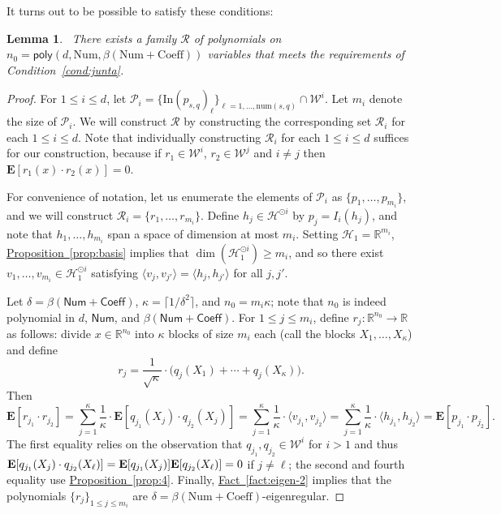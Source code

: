 \documentclass[11pt]{article}
\numberwithin{equation}{section}
\newtheorem{lemma}[theorem]{Lemma}
\theoremstyle{definition}
\theoremstyle{plain}
\newcommand{\R}{\mathbb R}
\newcommand{\expref}[2]{\hyperref[#2]{#1~\ref{#2}}}
\newcommand{\E}{{\bf E}}
\newcommand{\Inner}{\mathrm{In}}
\newcommand{\num}{\mathrm{num}}
\newcommand{\inr}[2]{\langle #1, #2 \rangle}
\newcommand{\Coeff}{\mathsf{Coeff}}
\newcommand{\Num}{\mathsf{Num}}
\begin{document}
It turns out to be possible to satisfy these conditions:
\begin{lemma}~\label{lem:junta-construct}
There exists a family $\mathcal{R}$ of polynomials on
$n_0= \mathsf{poly}(d, \mathrm{Num}, \beta(\mathrm{Num} + \mathrm{Coeff}))$ variables that
meets the requirements of Condition~\ref{cond:junta}.
\end{lemma}

\begin{proof}
For $1 \le i \le d$, let $\mathcal{P}_i = \{\Inner(p_{s,q})_\ell\}_{\ell =
1,\dots, \num({s,q})} \cap  \mathcal{W}^i$. Let $m_i$ denote the size of
$\mathcal{P}_i$. We will construct $\mathcal{R}$ by constructing the
corresponding set $\mathcal{R}_i$ for each $1 \le i \le d$. Note that
individually constructing $\mathcal{R}_i $ for each $1 \le i \le d$ suffices
for our construction, because if $r_1 \in \mathcal{W}^i$, $r_2 \in
\mathcal{W}^j$ and $i \neq j$ then $\mathbf{E}[r_1(x) \cdot r_2(x)]=0$. 

For convenience of notation, let us enumerate the elements of $\mathcal{P}_i$
as $\{p_1, \ldots, p_{m_i}\}$, and we will construct $\mathcal{R}_i = \{r_1,
\ldots, r_{m_i}\}$. Define $h_j \in \mathcal{H}^{\odot i}$ by $p_j = I_i(h_j)$,
and note that $h_1, \dots, h_{m_i}$ span a space of dimension at most $m_i$.
Setting $\mathcal{H}_1 = \R^{m_i}$, \expref{Proposition}{prop:basis} implies
that $\dim(\mathcal{H}_1^{\odot i}) \ge m_i$, and so there exist
$v_1,\dots, v_{m_i} \in \mathcal{H}_1^{\odot i}$ satisfying $\inr{v_j}{v_{j'}}
= \inr{h_j}{h_{j'}}$ for all $j, j'$.

Let $\delta = \beta(\Num + \Coeff)$, $\kappa = \lceil 1/\delta^2 \rceil$, and $n_0 = m_i \kappa$;
note that $n_0$ is indeed polynomial in $d$, $\Num$, and $\beta(\Num + \Coeff)$.
For $1 \le j \le m_i$, define
$r_j: \mathbb{R}^{n_0} \rightarrow \mathbb{R}$ as follows: divide $x \in
\mathbb{R}^{n_0}$ into $\kappa$ blocks of size $m_i$ each (call the blocks $X_1,
\ldots, X_{\kappa}$) and define
\[
r_j = \frac{1}{\sqrt{\kappa}} \cdot \big( q_{j}(X_1) + \cdots  + q_{j}(X_\kappa)\big). 
\]
Then
\[
\mathbf{E}[r_{j_1} \cdot r_{j_2}] = \sum_{j=1}^\kappa \frac{1}{\kappa} \cdot  \mathbf{E}[q_{j_1}(X_j) \cdot q_{j_2}(X_j)] = \sum_{j=1}^\kappa \frac{1}{\kappa} \cdot \langle v_{j_1}, v_{j_2} \rangle=\sum_{j=1}^\kappa \frac{1}{\kappa} \cdot \langle h_{j_1}, h_{j_2} \rangle = \mathbf{E} [p_{j_1} \cdot p_{j_2}].
\]
The first equality relies on the observation that $q_{j_1}, q_{j_2} \in
\mathcal{W}^{i}$ for $i>1$ and thus $\mathbf{E}[q_{j_1}(X_j) \cdot
q_{j_2}(X_\ell)]= \E[q_{j_1}(X_j)] \E [q_{j_2}(X_\ell)] = 0$ if $j \neq \ell$;
the second and fourth equality use \expref{Proposition}{prop:4}.
Finally, \expref{Fact}{fact:eigen-2} implies that the polynomials $\{r_{j}\}_{1 \le
j \le m_i}$ are $\delta = \beta(\mathrm{Num} + \mathrm{Coeff})$-eigenregular. 
\end{proof}
\end{document}
